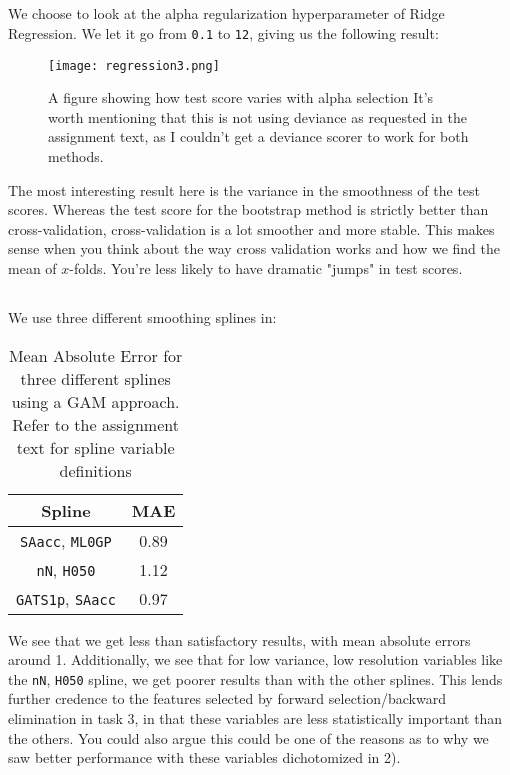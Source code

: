 \documentclass{article}
\begin{document}
\subsection{}
We choose to look at the alpha regularization hyperparameter of Ridge Regression. We let it go from \texttt{0.1} to \texttt{12}, giving us the following result:
\begin{figure}[ht!]
    \centering
    \texttt{[image: regression3.png]}
    \caption{A figure showing how test score varies with alpha selection \newline It's worth mentioning that this is not using deviance as requested in the assignment text, as I couldn't get a deviance scorer to work for both methods.}
    \label{figR3}
\end{figure} \newline
The most interesting result here is the variance in the smoothness of the test scores. Whereas the test score for the bootstrap method is strictly better than cross-validation, cross-validation is a lot smoother and more stable. This makes sense when you think about the way cross validation works and how we find the mean of $x$-folds. You're less likely to have dramatic "jumps" in test scores.
\newpage
\subsection{}
We use three different smoothing splines in:
\begin{table}[ht!]
    \centering
    \begin{tabular}{c|c}
         Spline& MAE \\
         \hline
         \texttt{SAacc}, \texttt{ML0GP}& 0.89 \\
         \texttt{nN}, \texttt{H050}& 1.12 \\
         \texttt{GATS1p}, \texttt{SAacc}& 0.97 \\
         \hline
    \end{tabular}
    \caption{Mean Absolute Error for three different splines using a GAM approach. \newline
    Refer to the assignment text \cite{assign} for spline variable definitions}
    \label{tabR2}
\end{table} \newline
We see that we get less than satisfactory results, with mean absolute errors around 1. Additionally, we see that for low variance, low resolution variables like the \texttt{nN}, \texttt{H050} spline, we get poorer results than with the other splines. This lends further credence to the features selected by forward selection/backward elimination in task 3, in that these variables are less statistically important than the others. You could also argue this could be one of the reasons as to why we saw better performance with these variables dichotomized in 2).
\end{document}
